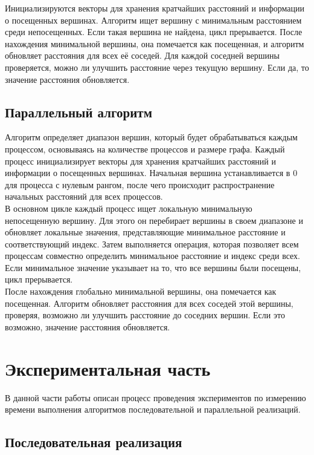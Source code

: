 \documentclass[a4paper, 14pt]{extarticle}
\begin{document}
Инициализируются векторы для хранения кратчайших расстояний и информации о посещенных вершинах. Алгоритм ищет вершину с минимальным расстоянием среди непосещенных. Если такая вершина не найдена, цикл прерывается. После нахождения минимальной вершины, она помечается как посещенная, и алгоритм обновляет расстояния для всех её соседей. Для каждой соседней вершины проверяется, можно ли улучшить расстояние через текущую вершину. Если да, то значение расстояния обновляется.

\subsection{Параллельный алгоритм}

Алгоритм определяет диапазон вершин, который будет обрабатываться каждым процессом, основываясь на количестве процессов и размере графа. Каждый процесс инициализирует векторы для хранения кратчайших расстояний и информации о посещенных вершинах. Начальная вершина устанавливается в 0 для процесса с нулевым рангом, после чего происходит распространение начальных расстояний для всех процессов.\\

В основном цикле каждый процесс ищет локальную минимальную непосещенную вершину. Для этого он перебирает вершины в своем диапазоне и обновляет локальные значения, представляющие минимальное расстояние и соответствующий индекс. Затем выполняется операция, которая позволяет всем процессам совместно определить минимальное расстояние и индекс среди всех. Если минимальное значение указывает на то, что все вершины были посещены, цикл прерывается.\\

После нахождения глобально минимальной вершины, она помечается как посещенная. Алгоритм обновляет расстояния для всех соседей этой вершины, проверяя, возможно ли улучшить расстояние до соседних вершин. Если это возможно, значение расстояния обновляется.

    \newpage
    \section{Экспериментальная часть}
В данной части работы описан процесс проведения экспериментов по измерению времени выполнения алгоритмов последовательной и параллельной реализаций.

\subsection{Последовательная реализация}
\end{document}
